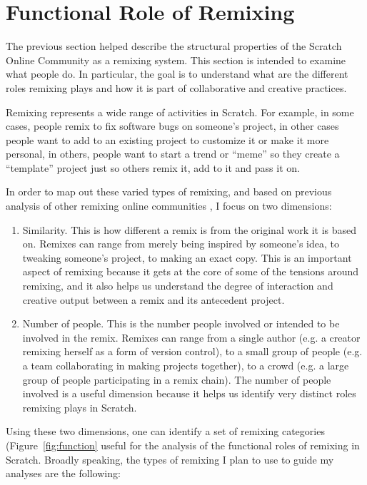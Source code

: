 \section{Functional Role of Remixing}

The previous section helped describe the structural properties of the Scratch Online Community as a remixing system.
This section is intended to examine what people do.
In particular, the goal is to understand what are the different roles remixing plays and how it is part of collaborative and creative practices.

Remixing represents a wide range of activities in Scratch.
For example, in some cases, people remix to fix software bugs on someone's project, in other cases people want to add to an existing project to customize it or make it more personal, in others, people want to start a trend or ``meme'' so they create a ``template'' project just so others remix it, add to it and pass it on.

In order to map out these varied types of remixing, and based on previous analysis of other remixing online communities \citep{seneviratne_remix_2010}, I focus on two dimensions:
\begin{enumerate}
\item{Similarity}. This is how different a remix is from the original work it is based on. 
Remixes can range from merely being inspired by someone's idea, to tweaking someone's project, to making an exact copy.
This is an important aspect of remixing because it gets at the core of some of the tensions around remixing, and it also helps us understand the degree of interaction and creative output between a remix and its antecedent project.
\item{Number of people}. This is the number people involved or intended to be involved in the remix.
Remixes can range from a single author (e.g. a creator remixing herself as a form of version control), to a small group of people (e.g. a team collaborating in making projects together), to a crowd (e.g. a large group of people participating in a remix chain).
The number of people involved is a useful dimension because it helps us identify very distinct roles remixing plays in Scratch.
\end{enumerate}

Using these two dimensions, one can identify a set of remixing categories (Figure~\ref{fig:function} useful for the analysis of the functional roles of remixing in Scratch.
Broadly speaking, the types of remixing I plan to use to guide my analyses are the following:


